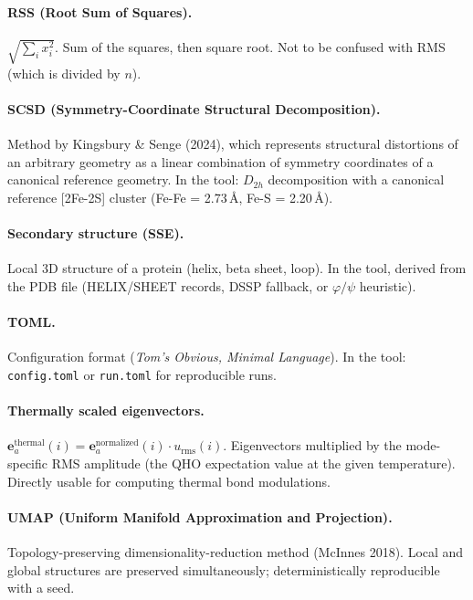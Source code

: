 \documentclass[11pt,a4paper,twoside]{article}
\providecommand{\angstrom}{\text{\AA}}    %
\theoremstyle{remark}
\begin{document}
\paragraph{RSS (Root Sum of Squares).}
$\sqrt{\sum_i x_i^2}$. Sum of the squares, then square root. Not
to be confused with RMS (which is divided by $n$).

\paragraph{SCSD (Symmetry-Coordinate Structural Decomposition).}
Method by Kingsbury \& Senge (2024), which represents structural
distortions of an arbitrary geometry as a linear combination of
symmetry coordinates of a canonical reference geometry. In the
tool: $D_{2h}$ decomposition with a canonical reference [2Fe-2S]
cluster (Fe-Fe = 2.73\,$\angstrom$, Fe-S = 2.20\,$\angstrom$).

\paragraph{Secondary structure (SSE).}
Local 3D structure of a protein (helix, beta sheet, loop). In the
tool, derived from the PDB file (HELIX/SHEET records, DSSP
fallback, or $\varphi/\psi$ heuristic).

\paragraph{TOML.}
Configuration format (\emph{Tom's Obvious, Minimal Language}).
In the tool: \texttt{config.toml} or \texttt{run.toml} for
reproducible runs.

\paragraph{Thermally scaled eigenvectors.}
$\mathbf{e}_a^\text{thermal}(i) = \mathbf{e}_a^\text{normalized}(i)
\cdot u_\text{rms}(i)$. Eigenvectors multiplied by the
mode-specific RMS amplitude (the QHO expectation value at the
given temperature). Directly usable for computing thermal bond
modulations.

\paragraph{UMAP (Uniform Manifold Approximation and Projection).}
Topology-preserving dimensionality-reduction method (McInnes 2018).
Local and global structures are preserved simultaneously;
deterministically reproducible with a seed.
\end{document}
